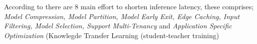 According to \cite{zhou_edge_2019} there are 8 main effort to shorten inference latency, these comprises; \textit{Model Compression, Model Partition, Model Early Exit, Edge Caching, Input Filtering, Model Selection, Support Multi-Tenancy} and \textit{Application Specific Optimization} (Knowlegde Transfer Learning (student-teacher training)




%
%	


